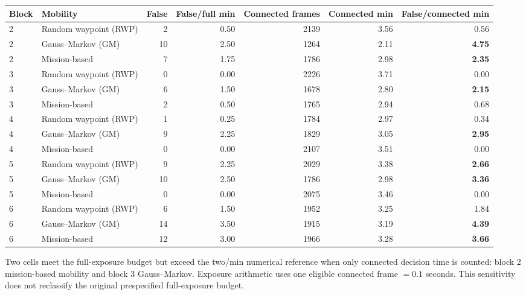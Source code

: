 \documentclass[10pt,a4paper]{article}
\begin{document}
\begin{center}
\small
\setlength{\tabcolsep}{3.8pt}
\begin{adjustbox}{max width=\linewidth}\begin{tabular}{llrrrrr}
\toprule
Block & Mobility & False & False/full min & Connected frames & Connected min & False/connected min \\
\midrule
2 & Random waypoint (RWP) & 2 & 0.50 & 2139 & 3.56 & 0.56 \\
2 & Gauss--Markov (GM) & 10 & 2.50 & 1264 & 2.11 & \textbf{4.75} \\
2 & Mission-based & 7 & 1.75 & 1786 & 2.98 & \textbf{2.35} \\
3 & Random waypoint (RWP) & 0 & 0.00 & 2226 & 3.71 & 0.00 \\
3 & Gauss--Markov (GM) & 6 & 1.50 & 1678 & 2.80 & \textbf{2.15} \\
3 & Mission-based & 2 & 0.50 & 1765 & 2.94 & 0.68 \\
4 & Random waypoint (RWP) & 1 & 0.25 & 1784 & 2.97 & 0.34 \\
4 & Gauss--Markov (GM) & 9 & 2.25 & 1829 & 3.05 & \textbf{2.95} \\
4 & Mission-based & 0 & 0.00 & 2107 & 3.51 & 0.00 \\
5 & Random waypoint (RWP) & 9 & 2.25 & 2029 & 3.38 & \textbf{2.66} \\
5 & Gauss--Markov (GM) & 10 & 2.50 & 1786 & 2.98 & \textbf{3.36} \\
5 & Mission-based & 0 & 0.00 & 2075 & 3.46 & 0.00 \\
6 & Random waypoint (RWP) & 6 & 1.50 & 1952 & 3.25 & 1.84 \\
6 & Gauss--Markov (GM) & 14 & 3.50 & 1915 & 3.19 & \textbf{4.39} \\
6 & Mission-based & 12 & 3.00 & 1966 & 3.28 & \textbf{3.66} \\
\bottomrule
\end{tabular}\end{adjustbox}
\end{center}

\noindent Two cells meet the full-exposure budget but exceed the two/min numerical reference when only connected decision time is counted: block 2 mission-based mobility and block 3 Gauss--Markov. Exposure arithmetic uses one eligible connected frame $=0.1$ seconds. This sensitivity does not reclassify the original prespecified full-exposure budget.
\end{document}
